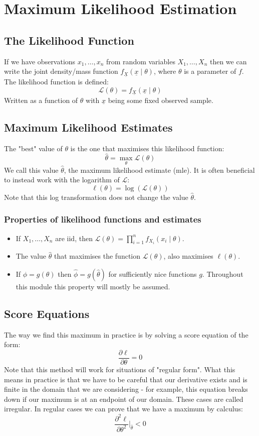 \documentclass[12pt]{article}
\newcommand{\pf}[2]{\frac{\partial #1}{\partial #2}}
\begin{document}
\section{Maximum Likelihood Estimation}
\subsection{The Likelihood Function}
If we have observations \(x_1,\dots,x_n\) from random variables \(X_1,\dots, X_n\) then we can write the joint density/mass function \(f_{\underline{X}}(\underline{x}\mid \theta)\), where \(\theta\) is a parameter of \(f\). The likelihood function is defined:
\[\mathcal{L}(\theta)=f_{\underline{X}}(\underline{x}\mid\theta)\]
Written as a function of \(\theta\) with \(\underline{x}\) being some fixed observed sample.
\subsection{Maximum Likelihood Estimates}
The "best" value of \(\theta\) is the one that maximises this likelihood function:
\[\hat{\theta}=\max_{\theta}\mathcal{L}(\theta)\]
We call this value \(\hat{\theta}\), the maximum likelihood estimate (mle). It is often beneficial to instead work with the logarithm of \(\mathcal{L}\):
\[\ell(\theta)=\log(\mathcal{L}(\theta))\]
Note that this log transformation does not change the value \(\hat{\theta}\).
\subsubsection{Properties of likelihood functions and estimates}
\begin{itemize}
    \item If \(X_1,\dots,X_n\) are iid, then \(\mathcal{L}(\theta)=\prod^n_{i=1}f_{X_i}(x_i\mid\theta)\).
    \item The value \(\hat{\theta}\) that maximises the function \(\mathcal{L}(\theta)\), also maximises \(\ell(\theta)\).
    \item If \(\phi=g(\theta)\) then \(\hat{\phi}=g(\hat{\theta})\) for sufficiently nice functions \(g\). Throughout this module this property will mostly be assumed.
\end{itemize}
\subsection{Score Equations}
The way we find this maximum in practice is by solving a score equation of the form:
\[\pf{\ell}{\theta}=0\]
Note that this method will work for situations of "regular form". What this means in practice is that we have to be careful that our derivative exists and is finite in the domain that we are considering - for example, this equation breaks down if our maximum is at an endpoint of our domain. These cases are called irregular. In regular cases we can prove that we have a maximum by calculus:
\[\pf{^2\ell}{\theta^2}|_{\hat{\theta}}<0\]
\end{document}
